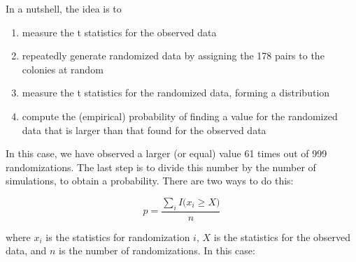 \documentclass[
  letterpaper,
  DIV=11,
  numbers=noendperiod]{scrreprt}
\newenvironment{Shaded}{\begin{snugshade}}{\end{snugshade}}
\newcommand{\NormalTok}[1]{\textcolor[rgb]{0.00,0.23,0.31}{#1}}
\providecommand{\tightlist}{%
  \setlength{\itemsep}{0pt}\setlength{\parskip}{0pt}}\usepackage{longtable,booktabs,array}
\begin{document}
In a nutshell, the idea is to

\begin{enumerate}
\def\labelenumi{\arabic{enumi}.}
\tightlist
\item
  measure the t statistics for the observed data
\item
  repeatedly generate randomized data by assigning the 178 pairs to the
  colonies at random
\item
  measure the t statistics for the randomized data, forming a
  distribution
\item
  compute the (empirical) probability of finding a value for the
  randomized data that is larger than that found for the observed data
\end{enumerate}

\begin{Shaded}
\end{Shaded}

In this case, we have observed a larger (or equal) value 61 times out of
999 randomizations. The last step is to divide this number by the number
of simulations, to obtain a probability. There are two ways to do this:

\[
p = \frac{\sum_i{I(x_i \geq X})}{n}
\]

where \(x_i\) is the statistics for randomization \(i\), \(X\) is the
statistics for the observed data, and \(n\) is the number of
randomizations. In this case:
\end{document}
